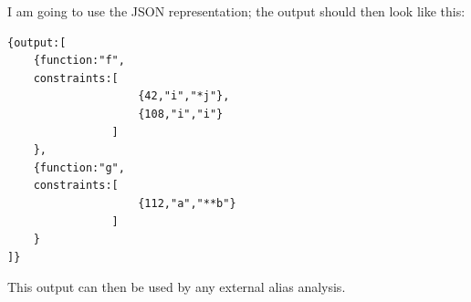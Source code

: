 I am going to use the JSON representation; the output should then look like this:

\begin{lstlisting}
{output:[
    {function:"f",
    constraints:[
                    {42,"i","*j"},
                    {108,"i","i"}
                ]
    },
    {function:"g",
    constraints:[
                    {112,"a","**b"}
                ]
    }
]}
\end{lstlisting}

This output can then be used by any external alias analysis.

